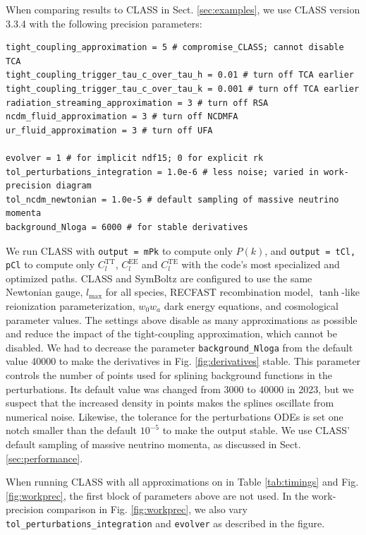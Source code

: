 \documentclass{aa}
\newcommand\lmax{l_\text{max}}
\begin{document}
When comparing results to CLASS in Sect. \ref{sec:examples}, we use CLASS version 3.3.4 with the following precision parameters:
\begin{codebox}
\begin{Verbatim}
tight_coupling_approximation = 5 # compromise_CLASS; cannot disable TCA
tight_coupling_trigger_tau_c_over_tau_h = 0.01 # turn off TCA earlier
tight_coupling_trigger_tau_c_over_tau_k = 0.001 # turn off TCA earlier
radiation_streaming_approximation = 3 # turn off RSA
ncdm_fluid_approximation = 3 # turn off NCDMFA
ur_fluid_approximation = 3 # turn off UFA

evolver = 1 # for implicit ndf15; 0 for explicit rk
tol_perturbations_integration = 1.0e-6 # less noise; varied in work-precision diagram
tol_ncdm_newtonian = 1.0e-5 # default sampling of massive neutrino momenta
background_Nloga = 6000 # for stable derivatives
\end{Verbatim}
\end{codebox}
We run CLASS with \verb|output = mPk| to compute only $P(k)$, and \verb|output = tCl, pCl| to compute only $C_l^\text{TT}$, $C_l^\text{EE}$ and $C_l^\text{TE}$ with the code's most specialized and optimized paths.
CLASS and SymBoltz are configured to use the same Newtonian gauge, $\lmax$ for all species, RECFAST recombination model, $\tanh$-like reionization parameterization, $w_0 w_a$ dark energy equations, and cosmological parameter values.
The settings above disable as many approximations as possible and reduce the impact of the tight-coupling approximation, which cannot be disabled.
We had to decrease the parameter \verb|background_Nloga| from the default value 40000 to make the derivatives in Fig. \ref{fig:derivatives} stable.
This parameter controls the number of points used for splining background functions in the perturbations.
Its default value was changed from 3000 to 40000 in 2023, but we suspect that the increased density in points makes the splines oscillate from numerical noise.
Likewise, the tolerance for the perturbations ODEs is set one notch smaller than the default $10^{-5}$ to make the output stable.
We use CLASS' default sampling of massive neutrino momenta, as discussed in Sect. \ref{sec:performance}.

When running CLASS with all approximations on in Table \ref{tab:timings} and Fig. \ref{fig:workprec}, the first block of parameters above are not used.
In the work-precision comparison in Fig. \ref{fig:workprec}, we also vary \verb|tol_perturbations_integration| and \verb|evolver| as described in the figure.
\end{document}
